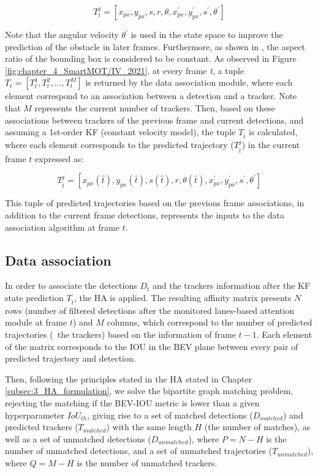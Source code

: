 \begin{equation}
	\label{state}
	T_{t}^{j} = [x_{px},y_{px},s,r,\theta,x_{px}^{'},y_{px}^{'},s^{'},\theta^{'}]
\end{equation}

Note that the angular velocity $\theta^{'}$ is used in the state space to improve the prediction of the obstacle in later frames. Furthermore, as shown in \cite{bewley2016simple}, the aspect ratio of the bounding box is considered to be constant. As observed in Figure \ref{fig:chapter_4_SmartMOT/IV_2021}, at every frame \textit{t}, a tuple $T_{t}=[T_{t}^{1},T_{t}^{2}, ...,T_{t}^{M}]$ is returned by the data association module, where each element correspond to an association between a detection and a tracker. Note that $M$ represents the current number of trackers. Then, based on these associations between trackers of the previous frame and current detections, and assuming a 1st-order \ac{KF} (constant velocity model), the tuple $T_{\hat{t}}$ is calculated, where each element corresponds to the predicted trajectory ($T_{\hat{t}}^{j}$) in the current frame $\textit{t}$ expressed as:

\begin{equation}
	\label{est}
	T_{\hat{t}}^{j} = [x_{px}(\hat{t}),y_{px}(\hat{t}),s(\hat{t}),r,\theta(\hat{t}),x_{px}^{'},y_{px}^{'},s^{'},\theta^{'}]
\end{equation}

This tuple of predicted trajectories based on the previous frame associations, in addition to the current frame detections, represents the inputs to the data association algorithm at frame $t$.

\subsection{Data association}
\label{subsec:4_smartmot_data_association}

In order to associate the detections $D_{t}$ and the trackers information after the \ac{KF} state prediction $T_{\hat{t}}$, the \acf{HA} is applied. The resulting affinity matrix presents $N$ rows (number of filtered detections after the monitored lanes-based attention module at frame $t$) and $M$ columns, which correspond to the number of predicted trajectories (\ie \ the trackers) based on the information of frame $t-1$. Each element of the matrix corresponds to the \ac{IOU} in the \ac{BEV} plane between every pair of predicted trajectory and detection. 

Then, following the principles stated in the \ac{HA} stated in Chapter \ref{subsec:3_HA_formulation}, we solve the bipartite graph matching problem, rejecting the matching if the \ac{BEV}-\ac{IOU} metric is lower than a given hyperparameter $IoU_{th}$, giving rise to a set of matched detections ($D_{matched}$) and predicted trackers ($T_{matched}$) with the same length $H$ (the number of matches), as well as a set of unmatched detections ($D_{unmatched}$), where $P = N - H$ is the number of unmatched detections, and a set of unmatched trajectories ($T_{unmatched}$), where $Q = M - H$ is the number of unmatched trackers.


